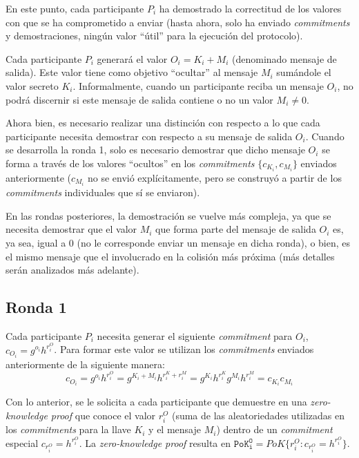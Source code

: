 En este punto, cada participante $P_i$ ha demostrado la correctitud de los valores con que se ha comprometido a enviar (hasta ahora, solo ha enviado \emph{commitments} y demostraciones, ningún valor ``útil'' para la ejecución del protocolo).

Cada participante $P_i$ generará el valor $O_i = K_i + M_i$ (denominado mensaje de salida). Este valor tiene como objetivo ``ocultar'' al mensaje $M_i$ sumándole el valor secreto $K_i$. Informalmente, cuando un participante reciba un mensaje $O_i$, no podrá discernir si este mensaje de salida contiene o no un valor $M_i \neq 0$.

Ahora bien, es necesario realizar una distinción con respecto a lo que cada participante necesita demostrar con respecto a su mensaje de salida $O_i$. Cuando se desarrolla la ronda 1, solo es necesario demostrar que dicho mensaje $O_i$ se forma a través de los valores ``ocultos'' en los \emph{commitments} $\{c_{K_i}, c_{M_i}\}$ enviados anteriormente ($c_{M_i}$ no se envió explícitamente, pero se construyó a partir de los \emph{commitments} individuales que sí se enviaron).

En las rondas posteriores, la demostración se vuelve más compleja, ya que se necesita demostrar que el valor $M_i$ que forma parte del mensaje de salida $O_i$ es, ya sea, igual a 0 (no le corresponde enviar un mensaje en dicha ronda), o bien, es el mismo mensaje que el involucrado en la colisión más próxima (más detalles serán analizados más adelante).

\subsection{Ronda 1}

Cada participante $P_i$ necesita generar el siguiente \emph{commitment} para $O_i$, $c_{O_i} = g^{o_i} h^{r_i^O}$. Para formar este valor se utilizan los \emph{commitments} enviados anteriormente de la siguiente manera: $$c_{O_i} = g^{o_i} h^{r_i^O} = g^{K_i + M_i} h^{r_i^K + r_i^M} = g^{K_i} h^{r_i^K} g^{M_i} h^{r_i^M} = c_{K_i} c_{M_i}$$

Con lo anterior, se le solicita a cada participante que demuestre en una \emph{zero-knowledge proof} que conoce el valor $r_i^O$ (suma de las aleatoriedades utilizadas en los \emph{commitments} para la llave $K_i$ y el mensaje $M_i$) dentro de un \emph{commitment} especial $c_{r_i^O} = h^{r_i^O}$. La \emph{zero-knowledge proof} resulta en $\mathtt{PoK_i^O} = PoK\{r_i^O : c_{r_i^O} = h^{r_i^O}\}$.

